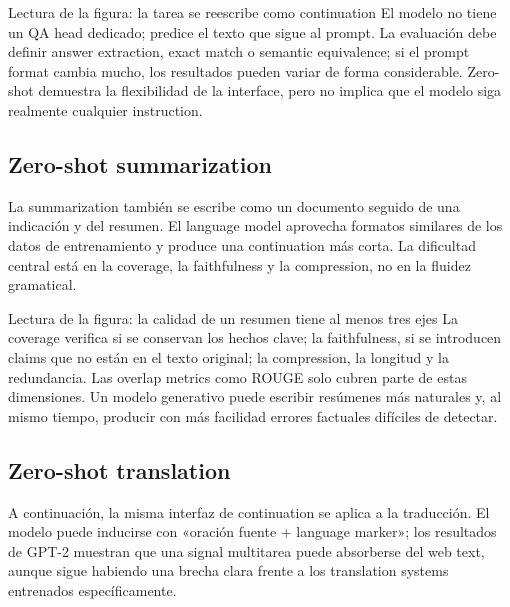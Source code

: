 
\begin{knowledgebox}{Lectura de la figura: la tarea se reescribe como continuation}
El modelo no tiene un QA head dedicado; predice el texto que sigue al prompt. La evaluación debe definir answer extraction, exact match o semantic equivalence; si el prompt format cambia mucho, los resultados pueden variar de forma considerable. Zero-shot demuestra la flexibilidad de la interface, pero no implica que el modelo siga realmente cualquier instruction.
\end{knowledgebox}

\subsection{Zero-shot summarization}

La summarization también se escribe como un documento seguido de una indicación y del resumen. El language model aprovecha formatos similares de los datos de entrenamiento y produce una continuation más corta. La dificultad central está en la coverage, la faithfulness y la compression, no en la fluidez gramatical.


\begin{knowledgebox}{Lectura de la figura: la calidad de un resumen tiene al menos tres ejes}
La coverage verifica si se conservan los hechos clave; la faithfulness, si se introducen claims que no están en el texto original; la compression, la longitud y la redundancia. Las overlap metrics como ROUGE solo cubren parte de estas dimensiones. Un modelo generativo puede escribir resúmenes más naturales y, al mismo tiempo, producir con más facilidad errores factuales difíciles de detectar.
\end{knowledgebox}

\subsection{Zero-shot translation}

A continuación, la misma interfaz de continuation se aplica a la traducción. El modelo puede inducirse con «oración fuente + language marker»; los resultados de GPT-2 muestran que una signal multitarea puede absorberse del web text, aunque sigue habiendo una brecha clara frente a los translation systems entrenados específicamente.

